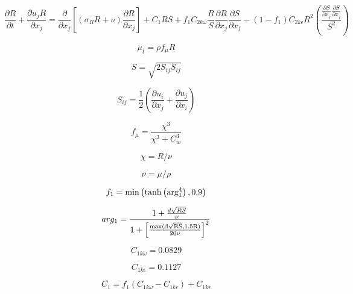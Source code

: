 

\begin{equation}
\frac{\partial R}{\partial t} + \frac{\partial u_j R}{\partial x_j}
= \frac{\partial}{\partial x_j} \left[(\sigma_R R + \nu) \frac{\partial R}{\partial x_j} \right]
+C_1RS + f_1 C_{2k\omega} \frac{R}{S} \frac{\partial R}{\partial x_j} \frac{\partial S}{\partial x_j}
-(1-f_1)C_{2k\epsilon}R^2 \left(\frac{\frac{\partial S}{\partial x_j} \frac{\partial S}{\partial x_j}}{S^2} \right)
\end{equation}

\begin{equation}
\mu_t = \rho f_{\mu} R
\end{equation}

\begin{equation}
S=\sqrt{2 S_{ij} S_{ij} }
\end{equation}

\begin{equation}
S_{ij} = \frac{1}{2} \left( \frac{\partial u_i}{\partial x_j} +
\frac{\partial u_j}{\partial x_i} \right)
\end{equation}

\begin{equation}
f_{\mu} = \frac{\chi^3}{\chi^3 + C_w^3}
\end{equation}

\begin{equation}
\chi = R/ \nu
\end{equation}

\begin{equation}
\nu = \mu/ \rho
\end{equation}

\begin{equation}
f_1 = \rm{min} \left(\rm{tanh} \left(arg_1^4 \right), 0.9 \right)
\end{equation}

\begin{equation}
arg_1 = \frac{1+ \frac{d \sqrt{RS}}{\nu}}{1+
\left[ \frac{\rm{max}(d \sqrt{RS}, 1.5 R)}{20 \nu} \right]^2}
\end{equation}

\begin{equation}
C_{1k\omega}=0.0829
\end{equation}

\begin{equation}
C_{1k\epsilon}=0.1127
\end{equation}

\begin{equation}
C_1 = f_1(C_{1k\omega} - C_{1k\epsilon}) + C_{1k\epsilon}
\end{equation}

